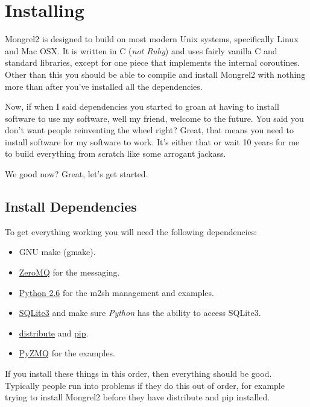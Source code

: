\chapter{Installing}

Mongrel2 is designed to build on most modern Unix systems, specifically Linux
and Mac OSX.  It is written in C (\emph{not Ruby}) and uses fairly vanilla
C and standard libraries, except for one piece that implements the internal
coroutines.  Other than this you should be able to compile and install Mongrel2
with nothing more than  after you've installed
all the dependencies.

Now, if when I said dependencies you started to groan at having to install
software to use my software, well my friend, welcome to the future.  You
said you don't want people reinventing the wheel right?  Great, that means
you need to install software for my software to work.  It's either that or
wait 10 years for me to build everything from scratch like some arrogant
jackass.

We good now?  Great, let's get started.

\section{Install Dependencies}

To get everything working you will need the following dependencies:

\begin{itemize}
\item GNU make (gmake).
\item \href{http://zeromq.org}{ZeroMQ} for the messaging.
\item \href{http://python.org}{Python 2.6} for the m2sh management and examples.
\item \href{http://www.sqlite.org/}{SQLite3} and make sure \emph{Python} has the ability to access SQLite3.
\item \href{http://pypi.python.org/pypi/distribute}{distribute} and \href{http://pypi.python.org/pypi/pip/0.7.2}{pip}.
\item \href{http://github.com/zeromq/pyzmq}{PyZMQ} for the examples.
\end{itemize}

If you install these things in this order, then everything should be good.
Typically people run into problems if they do this out of order, for example
trying to install Mongrel2 before they have distribute and pip installed.

